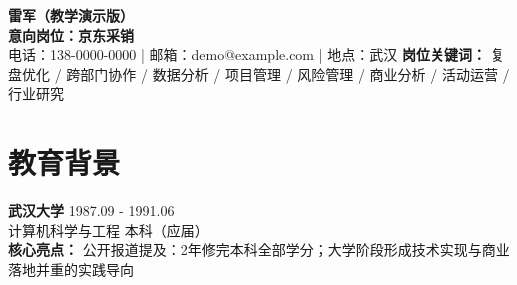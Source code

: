 \documentclass[a4paper,10pt]{article}
\begin{document}
\begin{center}
{\Huge \textbf{雷军（教学演示版）}} \\
\vspace{0.15cm}
\textbf{意向岗位：京东采销} \\
\vspace{0.1cm}
电话：138-0000-0000 \quad | \quad 邮箱：demo@example.com \quad | \quad 地点：武汉
\vspace{0.08cm}
\textbf{岗位关键词：} 复盘优化 / 跨部门协作 / 数据分析 / 项目管理 / 风险管理 / 商业分析 / 活动运营 / 行业研究
\end{center}
\section*{教育背景}
\textbf{武汉大学} \hfill 1987.09 - 1991.06 \\
计算机科学与工程 \hfill 本科（应届） \\
\textbf{核心亮点：} 公开报道提及：2年修完本科全部学分；大学阶段形成技术实现与商业落地并重的实践导向
\end{document}
